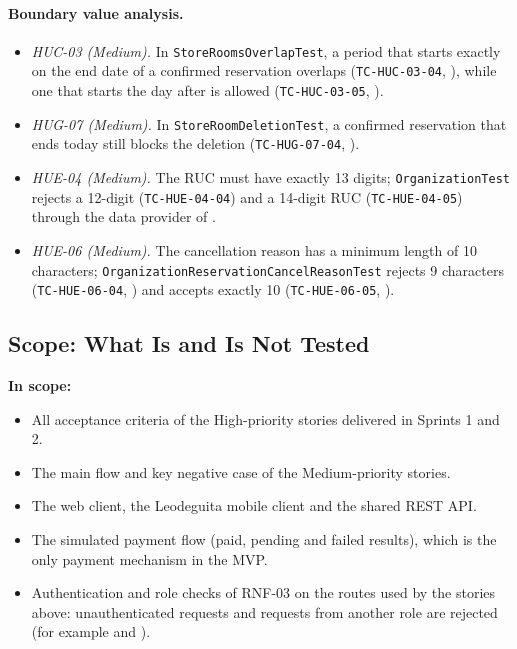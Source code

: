 \paragraph{Boundary value analysis.}
\begin{itemize}
  \item \emph{HUC-03 (Medium).} In \texttt{StoreRoomsOverlapTest}, a period that starts exactly on
        the end date of a confirmed reservation overlaps (\texttt{TC-HUC-03-04},
        ), while one that
        starts the day after is allowed (\texttt{TC-HUC-03-05},
        ).
  \item \emph{HUG-07 (Medium).} In \texttt{StoreRoomDeletionTest}, a confirmed reservation that
        ends today still blocks the deletion (\texttt{TC-HUG-07-04},
        ).
  \item \emph{HUE-04 (Medium).} The RUC must have exactly 13 digits; \texttt{OrganizationTest}
        rejects a 12-digit (\texttt{TC-HUE-04-04}) and a 14-digit RUC (\texttt{TC-HUE-04-05})
        through the data provider of
        .
  \item \emph{HUE-06 (Medium).} The cancellation reason has a minimum length of 10 characters;
        \texttt{OrganizationReservationCancelReasonTest} rejects 9 characters
        (\texttt{TC-HUE-06-04},
        ) and accepts
        exactly 10 (\texttt{TC-HUE-06-05},
        ).
\end{itemize}
\endgroup

\subsection{Scope: What Is and Is Not Tested}

\textbf{In scope:}
\begin{itemize}[nosep]
  \item All acceptance criteria of the High-priority stories delivered in Sprints 1 and 2.
  \item The main flow and key negative case of the Medium-priority stories.
  \item The web client, the Leodeguita mobile client and the shared REST API\@.
  \item The simulated payment flow (paid, pending and failed results), which is the only payment
        mechanism in the MVP\@.
  \item Authentication and role checks of RNF-03 on the routes used by the stories above:
        unauthenticated requests and requests from another role are rejected (for example
         and
        ).
\end{itemize}

